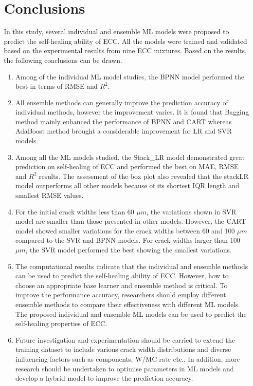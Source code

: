 \documentclass[11pt]{article}
\begin{document}
	\section{Conclusions}
	\label{con}
	
	In this study, several individual and ensemble ML models were proposed to predict the self-healing ability of ECC. All the models were trained and validated based on the experimental results from nine ECC mixtures. Based on the results, the following conclusions can be drawn.
	
	\begin{enumerate}
	    \item Among of the individual ML model studies, the BPNN model performed the best in terms of RMSE and $R^2$.
	    \item All ensemble methods can generally improve the prediction accuracy of individual methods, however the improvement varies. It is found that Bagging method mainly enhanced the performance of BPNN and CART whereas AdaBoost method brought a considerable improvement for LR and SVR models.
	    \item Among all the ML models studied, the Stack\_LR model demonstrated great prediction on self-healing of ECC and performed the best on MAE, RMSE and $R^2$ results. The assessment of the box plot also revealed that the stackLR model outperforms all other models because of its shortest IQR length and smallest RMSE values.
	   \item  For the initial crack widths less than 60 $\mu m$, the variations shown in SVR model are smaller than those presented in other models. However, the CART model showed smaller variations for the crack widths between 60 and 100 $\mu m$ compared to the SVR and BPNN models. For crack widths larger than 100 $\mu m$, the SVR model performed the best showing the smallest variations. 
	    \item The computational results indicate that the individual and ensemble methods can be used to predict the self-healing ability of ECC. However, how to choose an appropriate base learner and ensemble method is critical. To improve the performance accuracy, researchers should employ different ensemble methods to compare their effectiveness with different ML models. The proposed individual and ensemble ML models can be used to predict the self-healing properties of ECC.
	    \item Future investigation and experimentation should be carried to extend the training dataset to include various crack width distributions and diverse influencing factors such as components, W/MC rate etc.. In addition, more research should be undertaken to optimise parameters in ML models and develop a hybrid model to improve the prediction accuracy.
	\end{enumerate}
\end{document}
